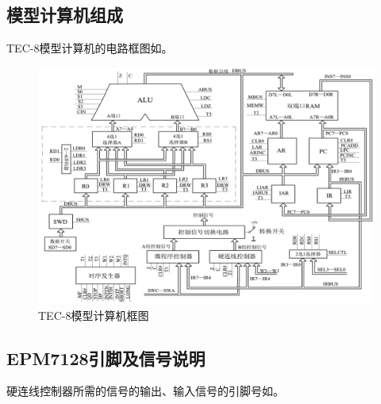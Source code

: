 \documentclass[lang=cn,11pt,a4paper,cite=authornum]{paper}
\begin{document}
\subsection{模型计算机组成}

TEC-8模型计算机的电路框图如。

\begin{figure}[htbp]
    \centering
    \includegraphics[width=\linewidth]{./Images/tec8model.png}
    \caption{TEC-8模型计算机框图\label{fig:tec8model}}
\end{figure}

\subsection{EPM7128引脚及信号说明}

硬连线控制器所需的信号的输出、输入信号的引脚号如。
\end{document}
